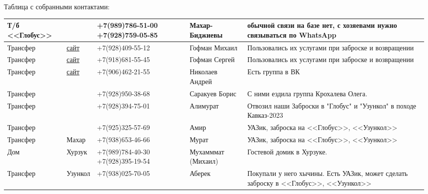 			Таблица с собранными контактами:
			\setlength{\arrayrulewidth}{0.2mm}
			\setlength{\tabcolsep}{0pt}
			\renewcommand{\arraystretch}{1}
			\begin{longtable}{|>{\centering\arraybackslash}m{3cm}|>{\centering\arraybackslash}m{2cm}|>{\centering\arraybackslash}m{4cm}|>{\centering\arraybackslash}m{4cm}|>{\centering\arraybackslash}m{5cm}|} \hline
				Т/б <<Глобус>> 	&											&	+7(989)786-51-00 +7(928)759-05-85	&	Махар-Биджиевы		&	обычной связи на базе нет, с хозяевами нужно связываться по WhatsApp                	\\ \hline
				Трансфер 		&	\href{https://transfer-tur.ru}{сайт}	&	+7(928)409-55-12					&	Гофман Михаил		&	Пользовались их услугами при заброске и возвращении                                 	\\ \hline
				Трансфер 		&	\href{https://transfer-tur.ru}{сайт}	&	+7(918)681-55-45					&	Гофман Сергей		&	Пользовались их услугами при заброске и возвращении                                 	\\ \hline
				Трансфер 		&	\href{http://minvodytransfer.ru}{сайт}	&	+7(906)462-21-55					&	Николаев Андрей		&	Есть группа в ВК                                                                    	\\ \hline
				Трансфер 		& 											&	+7(928)950-38-68					&	Саракуев Борис		&	С ними ездила группа Крохалева Олега.                                               	\\ \hline
				Трансфер 		& 											&	+7(928)394-75-01					&	Алимурат			&	Отвозил наши Заброски в "Глобус" и "Узункол" в походе Кавказ-2023                   	\\ \hline
				Трансфер 		& 											&	+7(925)325-57-69					&	Амир				&	УАЗик, заброска на <<Глобус>>, <<Узункол>>                                          	\\ \hline
				Трансфер 		&	Махар	 								&	+7(938)653-46-66					&	Мурат				&	УАЗик, заброска на <<Глобус>>, <<Узункол>>                                          	\\ \hline
				Дом		 		&	Хурзук	 								&	+7(989)784-40-30 +7(928)395-19-54	&	Мухамммат (Михаил)	&	Гостевой домик в Хурзуке.                                                           	\\ \hline
				Трансфер 		&	Узункол	 								&	+7(938)025-70-05					&	Аберек				&	Покупали у него хычины. Есть УАЗик, может сделать заброску в <<Глобус>>, <<Узункол>>	\\ \hline
			\end{longtable}
			\setlength{\arrayrulewidth}{0.3mm}
			\setlength{\arraycolsep}{5pt}
			\renewcommand{\arraystretch}{1.8}


